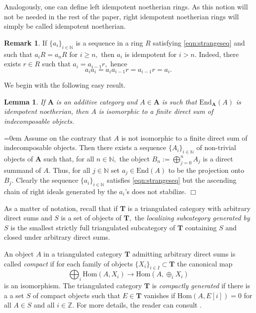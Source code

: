 \documentclass[a4paper,11pt,twoside]{amsart}
\newtheorem{lem}[thm]{Lemma}
\numberwithin{equation}{section}
\theoremstyle{definition}
\newtheorem{remark}[thm]{Remark}
\renewenvironment{proof}{\par\vspace{-5pt}\par\noindent\begingroup\leftskip=0em\hspace{0em}{\bf Proof.}}{\endgroup\hfill$\Box$}
\begin{document}
Analogously, one can define left idempotent noetherian rings. As this notion will not be needed in the rest of the paper, right idempotent noetherian rings will simply be called idempotent noetherian.

\begin{remark}\label{rmk:idem}
If $\{a_i\}_{i\in{\mathbb{N}}}$ is a sequence in a ring $R$ satisfying
\eqref{eqn:strangeseq} and such that $a_iR=a_nR$ for $i\geq n,$ then
$a_i$ is idempotent for $i>n.$ Indeed, there exists $r\in R$ such that
$a_i=a_{i-1}r,$ hence
\[a_ia_i=a_ia_{i-1}r=a_{i-1}r=a_i.\]
\end{remark}

We begin with the following easy result.

\begin{lem}\label{lem:useful}
If ${{\mathbf{{A}}}}$ is an additive category and $A\in{{\mathbf{{A}}}}$ is such that ${\mathrm{End}}_{{{\mathbf{{A}}}}}(A)$ is idempotent noetherian, then $A$ is isomorphic to a finite direct sum of indecomposable objects.
\end{lem}

\begin{proof}
Assume on the contrary that $A$ is not isomorphic to a finite direct sum of indecomposable objects. Then there exists a sequence $\{A_i\}_{i\in{\mathbb{N}}}$ of non-trivial objects of ${{\mathbf{{A}}}}$ such that, for all $n\in{\mathbb{N}},$ the object $B_n:=\bigoplus_{j=0}^n A_j$ is a direct summand of $A.$ Thus, for all $j\in{\mathbb{N}}$ set $a_j\in{\mathrm{End}}(A)$ to be the projection onto $B_j.$ Clearly the sequence $\{a_i\}_{i\in{\mathbb{N}}}$ satisfies \eqref{eqn:strangeseq} but the ascending chain of right ideals generated by the $a_i$'s does not stabilize.
\end{proof}

As a matter of notation, recall that if ${{\mathbf{{T}}}}$ is a
triangulated category with arbitrary direct sums and $S$ is a
set of objects of ${{\mathbf{{T}}}},$ the {\em localizing subcategory
  generated by $S$} is the smallest strictly full triangulated
subcategory of ${{\mathbf{{T}}}}$ containing $S$ and closed under
arbitrary direct sums.

An object $A$ in a triangulated category ${{\mathbf{{T}}}}$ admitting arbitrary direct sums is called \emph{compact} if for each family of objects $\{X_i\}_{i\in I}\subset{{\mathbf{{T}}}}$ the canonical map
\[
\bigoplus_i{\mathrm{Hom}}(A,X_i)\longrightarrow{\mathrm{Hom}}\left(A,\oplus_i X_i\right)
\]
is an isomorphism. The triangulated category ${{\mathbf{{T}}}}$ is \emph{compactly generated} if there is a a set $S$ of compact objects such that $E\in{{\mathbf{{T}}}}$ vanishes if ${\mathrm{Hom}}(A,{{E}[i]})=0$ for all $A\in S$ and all $i\in{\mathbb{Z}}.$ For more details, the reader can consult \cite[Sect.\ 3.1]{R}.
\end{document}
